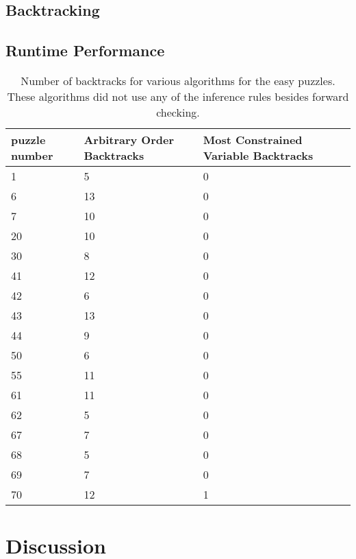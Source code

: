 \documentclass{article}
\begin{document}
 \subsection{Backtracking}
\subsection{Runtime Performance}
\begin{table}[h]\centering
  \begin{tabular}{lll}
    \toprule
    puzzle number& Arbitrary Order Backtracks & Most Constrained Variable Backtracks\\
    \midrule
    1& 5 & 0\\
    \midrule
    6& 13&0\\
    \midrule
    7& 10&0\\
    \midrule
    20&10&0\\
    \midrule
    30& 8&0\\
    \midrule
    41& 12& 0\\
    \midrule
    42& 6& 0\\
    \midrule
    43& 13&0\\
    \midrule
    44&9&0\\
    \midrule
    50&6&0\\
    \midrule
    55 &11 &0\\
    \midrule
    61& 11 &0\\
    \midrule
    62 &5&0\\
    \midrule
    67&7&0\\
    \midrule
    68& 5&0\\
    \midrule
    69&7&0\\
    \midrule
    70& 12 &1\\
    \bottomrule
  \end{tabular}
  \caption{Number of backtracks for various algorithms for the easy puzzles. These algorithms did not use any of the inference rules besides forward checking. }
  \label{tab:resultsEasy}
\end{table}
\section{Discussion}



  
\end{document}
